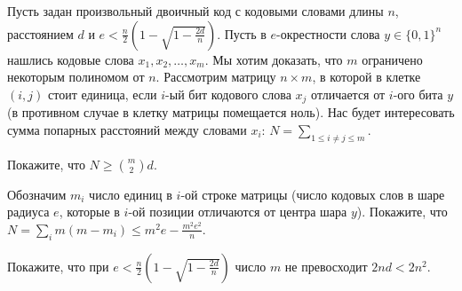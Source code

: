 Пусть задан произвольный двоичный код с кодовыми словами длины $n$, расстоянием $d$ и $e < \frac{n}{2}(1 -
\sqrt{1 - \frac{2d}{n}})$. Пусть в $e$-окрестности слова $y \in \{0, 1\}^n$ нашлись кодовые слова $x_1, x_2, \dots, x_m$. Мы
хотим доказать, что $m$ ограничено некоторым полиномом от $n$. Рассмотрим матрицу $n \times m$, в которой в клетке $(i, j)$
стоит единица, если $i$-ый бит кодового слова $x_j$ отличается от $i$-ого бита $y$ (в противном случае в клетку матрицы
помещается ноль). Нас будет интересовать сумма попарных расстояний между словами $x_i$: $N =
\sum\limits_{1 \le i \neq j \le m}$.
\begin{enumcyr}
    \item Покажите, что $N \ge \binom{m}{2} d$.
    \item Обозначим $m_i$ число единиц в $i$-ой строке матрицы (число кодовых слов в шаре радиуса $e$, которые в $i$-ой
    	позиции отличаются от центра шара $y$). Покажите, что $N = \sum\limits_{i} m (m - m_i) \le m^2 e -
		\frac{m^2 e^2}{n}$.
    \item Покажите, что при $e < \frac{n}{2}(1 - \sqrt{1 - \frac{2d}{n}})$ число $m$ не превосходит $2nd < 2n^2$.
\end{enumcyr}